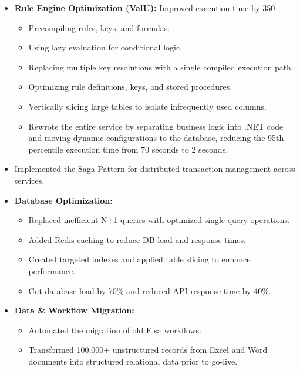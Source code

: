 \documentclass[11pt]{article}
\begin{document}
\begin{itemize}[left=0pt]
\begin{itemize}[left=0pt]
      \item \textbf{Rule Engine Optimization (ValU):}
        Improved execution time by 350%
        \begin{itemize}
          \item Precompiling rules, keys, and formulas.
          \item Using lazy evaluation for conditional logic.
          \item Replacing multiple key resolutions with a single
            compiled execution path.
          \item Optimizing rule definitions, keys, and stored procedures.
          \item Vertically slicing large tables to isolate
            infrequently used columns.
          \item Rewrote the entire service by separating business
            logic into .NET code and moving dynamic configurations to
            the database, reducing the 95th percentile execution time
            from 70 seconds to 2 seconds.
        \end{itemize}

      \item Implemented the Saga Pattern for distributed transaction management across services.

      \item \textbf{Database Optimization:}
        \begin{itemize}
          \item Replaced inefficient N+1 queries with optimized
            single-query operations.
          \item Added Redis caching to reduce DB load and response times.
          \item Created targeted indexes and applied table slicing to
            enhance performance.
          \item Cut database load by 70\% and reduced API response time by 40\%.
        \end{itemize}

      \item \textbf{Data \& Workflow Migration:}
        \begin{itemize}
          \item Automated the migration of old Elsa workflows.
          \item Transformed 100,000+ unstructured records from Excel
            and Word documents into structured relational data prior to go-live.
        \end{itemize}


\end{itemize}
\end{itemize}
\end{document}
